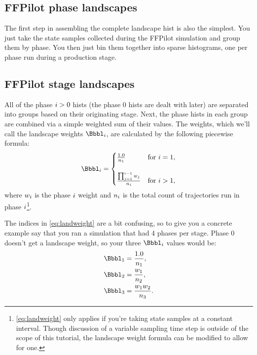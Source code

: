 \subsection{FFPilot phase landscapes}\label{sec:landscape_phase}
The first step in assembling the complete landscape hist is also the simplest. You just take the state samples collected during the FFPilot simulation and group them by phase. You then just bin them together into sparse histograms, one per phase run during a production stage.

\subsection{FFPilot stage landscapes}\label{sec:landscape_stage}
All of the phase $i>0$ hists (the phase 0 hists are dealt with later) are separated into groups based on their originating stage. Next, the phase hists in each group are combined via a simple weighted sum of their values. The weights, which we'll call the landscape weights $\landweight$, are calculated by the following piecewise formula:
\begin{equation}
\label{eq:landweight}
    \landweight =
    \begin{cases}
        \frac{1.0}{n_1} & \text{for}\ \ix=1, \\
        \\
        \frac{ \prod_{\jx=1}^{\ix - 1} w_{\jx}}{n_{\ix}} & \text{for}\ \ix>1,
    \end{cases}
\end{equation}
where $w_{i}$ is the phase $i$ weight and $n_{i}$ is the total count of trajectories run in phase $i$\footnote{\eqref{eq:landweight} only applies if you're taking state samples at a constant interval. Though discussion of a variable sampling time step is outside of the scope of this tutorial, the landscape weight formula can be modified\cite{Valeriani:2007hv} to allow for one.}.

The indices in \eqref{eq:landweight} are a bit confusing, so to give you a concrete example say that you ran a simulation that had 4 phases per stage. Phase 0 doesn't get a landscape weight, so your three $\landweight$ values would be:
\begin{align*}
    \landweightx{1} &= \frac{1.0}{n_1},\\
    \landweightx{2} &= \frac{w_1}{n_2},\\
    \landweightx{3} &= \frac{w_1 w_2}{n_3}.\\
\end{align*}



